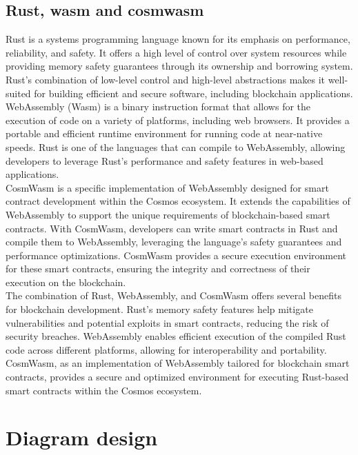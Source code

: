 \documentclass[../Main.tex]{subfiles}
\begin{document}
\subsection{Rust, wasm and cosmwasm}
Rust is a systems programming language known for its emphasis on performance, reliability, and safety. It offers a high level of control over system resources while providing memory safety guarantees through its ownership and borrowing system. Rust's combination of low-level control and high-level abstractions makes it well-suited for building efficient and secure software, including blockchain applications.\\
\indent WebAssembly (Wasm) is a binary instruction format that allows for the execution of code on a variety of platforms, including web browsers. It provides a portable and efficient runtime environment for running code at near-native speeds. Rust is one of the languages that can compile to WebAssembly, allowing developers to leverage Rust's performance and safety features in web-based applications.\\
\indent CosmWasm is a specific implementation of WebAssembly designed for smart contract development within the Cosmos ecosystem. It extends the capabilities of WebAssembly to support the unique requirements of blockchain-based smart contracts. With CosmWasm, developers can write smart contracts in Rust and compile them to WebAssembly, leveraging the language's safety guarantees and performance optimizations. CosmWasm provides a secure execution environment for these smart contracts, ensuring the integrity and correctness of their execution on the blockchain.\\
\indent The combination of Rust, WebAssembly, and CosmWasm offers several benefits for blockchain development. Rust's memory safety features help mitigate vulnerabilities and potential exploits in smart contracts, reducing the risk of security breaches. WebAssembly enables efficient execution of the compiled Rust code across different platforms, allowing for interoperability and portability. CosmWasm, as an implementation of WebAssembly tailored for blockchain smart contracts, provides a secure and optimized environment for executing Rust-based smart contracts within the Cosmos ecosystem.\\

\section{Diagram design}
\end{document}
